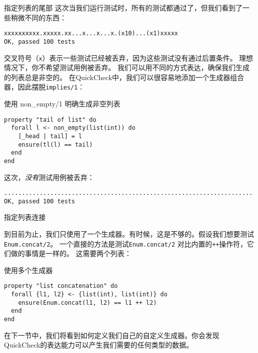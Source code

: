 \begin{example}{指定列表的尾部}
这次当我们运行测试时，所有的测试都通过了，但我们看到了一些稍微不同的东西：

\begin{code}{}\begin{verbatim}
xxxxxxxxxx.xxxxx.xx...x...x...x.(x10)...(x1)xxxxx
OK, passed 100 tests
\end{verbatim}
\end{code}

交叉符号（\texttt{x}）表示一些测试已经被丢弃，因为这些测试没有通过后置条件。
理想情况下，你不希望测试用例被丢弃。
我们可以用不同的方式表达，确保我们生成的列表总是非空的。
在QuickCheck中，我们可以很容易地添加一个生成器组合器，因此摆脱\texttt{implies/1}：

\begin{code}{使用 non\_empty/1 明确生成非空列表}
\begin{verbatim}
property "tail of list" do
  forall l <- non_empty(list(int)) do
    [_head | tail] = l
    ensure(tl(l) == tail)
  end
end
\end{verbatim}
\label{lst:using_non_empty_1_to_explicitly_generate_non_empty_lists}
\end{code}

这次，\emph{没有}测试用例被丢弃：

\begin{verbatim}
.................................................................................................... 
OK, passed 100 tests
\end{verbatim}
\end{example}

\begin{example}{指定列表连接}


到目前为止，我们只使用了一个生成器。有时候，这是不够的。假设我们想要测试\texttt{Enum.concat/2}。
一个直接的方法是测试\texttt{Enum.concat/2} 对比内置的\texttt{++}操作符，它们做的事情是一样的。
这需要两个列表：

\begin{code}{使用多个生成器}
\begin{verbatim}
property "list concatenation" do
  forall {l1, l2} <- {list(int), list(int)} do
    ensure(Enum.concat(l1, l2) == l1 ++ l2)
  end
end
\end{verbatim}
\label{lst:using_multiple_generators}
\end{code}

\end{example}

在下一节中，我们将看到如何定义我们自己的自定义生成器。你会发现QuickCheck的表达能力可以产生我们需要的任何类型的数据。

